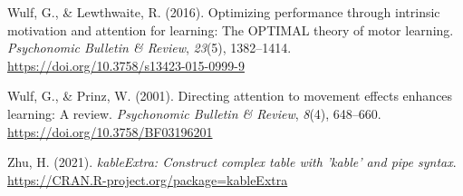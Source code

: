 \documentclass[
  11pt,
  doc, donotrepeattitle,floatsintext]{apa7}
\newlength{\cslhangindent}
\newlength{\cslentryspacingunit} %
\newenvironment{CSLReferences}[2] %
 {%
  \setlength{\parindent}{0pt}
  \ifodd #1
  \let\oldpar\par
  \def\par{\hangindent=\cslhangindent\oldpar}
  \fi
  \setlength{\parskip}{#2\cslentryspacingunit}
 }%
 {}
\begin{document}
\begin{CSLReferences}{1}{0}
\leavevmode{}%
Wulf, G., \& Lewthwaite, R. (2016). Optimizing performance through intrinsic motivation and attention for learning: {The OPTIMAL} theory of motor learning. \emph{Psychonomic Bulletin \& Review}, \emph{23}(5), 1382--1414. \url{https://doi.org/10.3758/s13423-015-0999-9}

\leavevmode{}%
Wulf, G., \& Prinz, W. (2001). Directing attention to movement effects enhances learning: {A} review. \emph{Psychonomic Bulletin \& Review}, \emph{8}(4), 648--660. \url{https://doi.org/10.3758/BF03196201}

\leavevmode{}%
Zhu, H. (2021). \emph{kableExtra: Construct complex table with 'kable' and pipe syntax}. \url{https://CRAN.R-project.org/package=kableExtra}

\end{CSLReferences}
\end{document}
